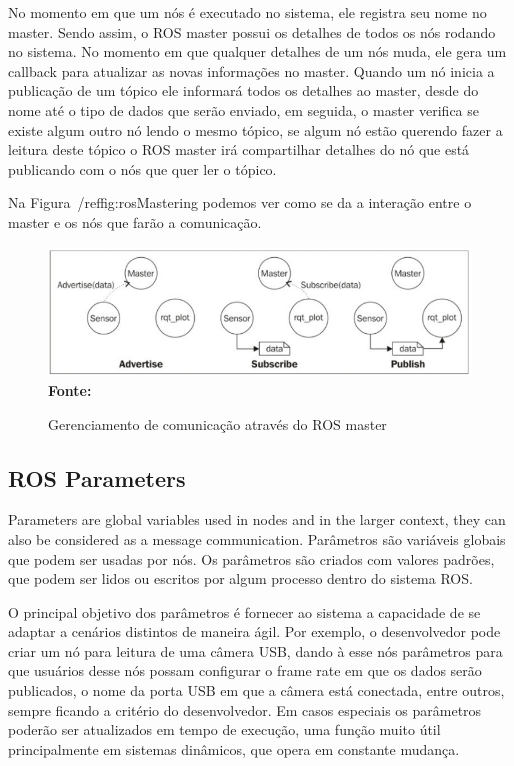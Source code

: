 No momento em que um nós é executado no sistema, ele registra seu nome no master. Sendo assim, o ROS master possui os detalhes de todos os nós rodando no sistema. No momento em que qualquer detalhes de um nós muda, ele gera um callback para atualizar as novas informações no master. Quando um nó inicia a publicação de um tópico ele informará todos os detalhes ao master, desde do nome até o tipo de dados que serão enviado, em seguida, o master verifica se existe algum outro nó lendo o mesmo tópico, se algum nó estão querendo fazer a leitura deste tópico o ROS master irá compartilhar detalhes do nó que está publicando com o nós que quer ler o tópico.

Na Figura~/ref{fig:rosMastering} podemos ver como se da a interação entre o master e os nós que farão a comunicação.


\begin{figure}[ht]
	\caption{Gerenciamento de comunicação através do ROS master}
	\begin{center}
		\includegraphics[scale=0.51]{imagens/rosmaster.png}\\
		{\small \textbf{Fonte:} }
    \end{center}\label{fig:rosMastering}
\end{figure}

\subsection{ROS Parameters}

Parameters are global variables used in nodes and in the larger context, they can also be considered as a message communication. Parâmetros são variáveis globais que podem ser usadas por nós. Os parâmetros são criados com valores padrões, que podem ser lidos ou escritos por algum processo dentro do sistema ROS. 

O principal objetivo dos parâmetros é fornecer ao sistema a capacidade de se adaptar a cenários distintos de maneira ágil. Por exemplo, o desenvolvedor pode criar um nó para leitura de uma câmera USB, dando à esse nós parâmetros para que usuários desse nós possam configurar o frame rate em que os dados serão publicados, o nome da porta USB em que a câmera está conectada, entre outros, sempre ficando a critério do desenvolvedor. Em casos especiais os parâmetros poderão ser atualizados em tempo de execução, uma função muito útil principalmente em sistemas dinâmicos, que opera em constante mudança.







